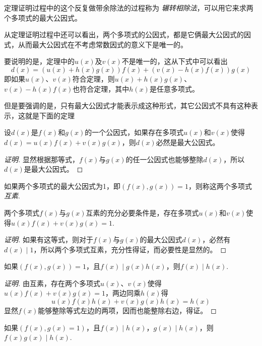 定理证明过程中的这个反复做带余除法的过程称为 \emph{辗转相除法}，可以用它来求两个多项式的最大公因式。

从定理证明过程中还可以看出，两个多项式的公因式，都是它俩最大公因式的因式，从而最大公因式在不考虑常数因式的意义下是唯一的。

要说明的是，定理中的$u(x)$及$v(x)$不是唯一的，这从下式中可以看出
\[ d(x) = (u(x)+h(x)g(x))f(x)+(v(x)-h(x)f(x))g(x) \]
即如果$u(x)$、$v(x)$符合定理，则$u(x)+h(x)g(x)$、$v(x)-h(x)f(x)$也符合定理，其中$h(x)$是任意多项式。

但是要强调的是，只有最大公因式才能表示成这种形式，其它公因式不具有这种表示，这就是下面的定理
\begin{theorem}
  设$d(x)$是$f(x)$和$g(x)$的一个公因式，如果存在多项式$u(x)$和$v(x)$使得$d(x)=u(x)f(x)+v(x)g(x)$，则$d(x)$必然是最大公因式。
\end{theorem}

\begin{proof}[证明]
  显然根据那等式，$f(x)$与$g(x)$的任一公因式也能够整除$d(x)$，所以$d(x)$是最大公因式。
\end{proof}

\begin{definition}
  如果两个多项式的最大公因式为1，即$(f(x),g(x))=1$，则称这两个多项式 \emph{互素}.
\end{definition}

\begin{theorem}
  两个多项式$f(x)$与$g(x)$互素的充分必要条件是，存在多项式$u(x)$和$v(x)$使得$u(x)f(x)+v(x)g(x)=1$.
\end{theorem}

\begin{proof}[证明]
  如果有这等式，则对于$f(x)$与$g(x)$的最大公因式$d(x)$，必然有$d(x) \mid 1$，所以两个多项式互素，充分性得证，而必要性是显然的。
\end{proof}

\begin{theorem}
  \label{theorem:f-prime-g-and-f-mid-gh-so-f-mid-h}
  如果$(f(x),g(x))=1$，且$f(x) \mid g(x)h(x)$，则$f(x) \mid h(x)$.
\end{theorem}

\begin{proof}[证明]
  由互素，存在两个多项式$u(x)$、$v(x)$使得$u(x)f(x)+v(x)g(x)=1$，两边同乘$h(x)$得
  \[ u(x)f(x)h(x) + v(x)g(x)h(x) = h(x) \]
  显然$f(x)$能够整除等式左边的两项，因而也能整除右边，得证。
\end{proof}

\begin{inference}
  如果$(f(x),g(x)=1)$，且$f(x) \mid h(x)$，$g(x) \mid h(x)$，则$f(x)g(x) \mid h(x)$.
\end{inference}

